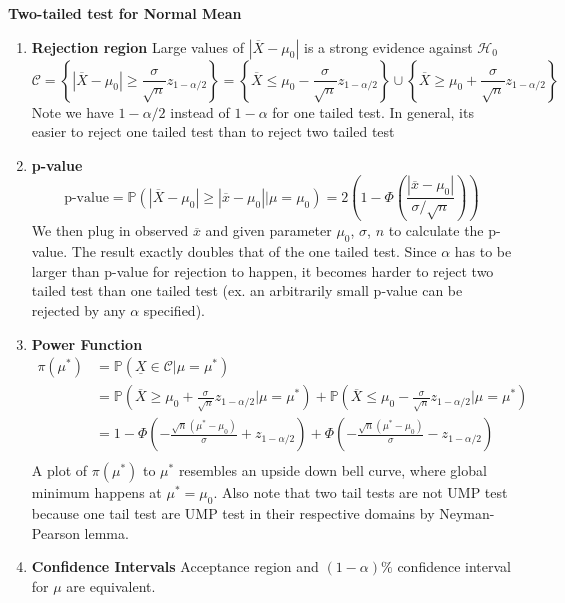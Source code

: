 \documentclass[11pt]{article}
\begin{document}
\begin{example}
  \textbf{Two-tailed test for Normal Mean}
  \begin{enumerate}
    \item \textbf{Rejection region} Large values of $|\overline{X} - \mu_0|$ is a strong evidence against $\mathcal{H}_0$
    \[
      \mathcal{C} = \left\{ | \overline{X} - \mu_0| \geq \frac{\sigma}{\sqrt{n}} z_{1 - \alpha / 2} \right\} =  \left\{ \overline{X} \leq \mu_0 - \frac{\sigma}{\sqrt{n}} z_{1 - \alpha / 2} \right\} \cup  \left\{ \overline{X} \geq \mu_0  + \frac{\sigma}{\sqrt{n}} z_{1 - \alpha / 2} \right\}
    \]
    Note we have $1 - \alpha / 2$ instead of $1 - \alpha$ for one tailed test. In general, its easier to reject one tailed test than to reject two tailed test
    \item \textbf{p-value}
    \[
      \text{p-value} = \mathbb{P}\left(|\overline{X} - \mu_0| \geq |\overline{x} - \mu_0| \biggr\rvert \mu = \mu_0\right) = 2(1 - \Phi(\frac{|\overline{x} - \mu_0|}{\sigma / \sqrt{n}}) )
    \]
    We then plug in observed $\overline{x}$ and given parameter $\mu_0$, $\sigma$, $n$ to calculate the p-value. The result exactly doubles that of the one tailed test. Since $\alpha$ has to be larger than p-value for rejection to happen, it becomes harder to reject two tailed test than one tailed test (ex. an arbitrarily small p-value can be rejected by any $\alpha$ specified).
    \item \textbf{Power Function}
    \begin{align*}
      \pi(\mu^*) &= \mathbb{P}(\underline{X}\in \mathcal{C} | \mu = \mu^*) \\
      &= \mathbb{P}(\overline{X} \geq \mu_0 + \frac{\sigma}{\sqrt{n}}z_{1 - \alpha / 2} | \mu = \mu^*) + \mathbb{P}(\overline{X} \leq \mu_0 - \frac{\sigma}{\sqrt{n}}z_{1 - \alpha / 2} | \mu = \mu^*)\\
      &= 1- \Phi(-\frac{\sqrt{n}(\mu^* - \mu_0)}{\sigma} + z_{1 - \alpha/2}) + \Phi(-\frac{\sqrt{n}(\mu^* - \mu_0)}{\sigma} - z_{1 - \alpha/2})\\
    \end{align*}
    A plot of $\pi(\mu^*)$ to $\mu^*$ resembles an upside down bell curve, where global minimum happens at $\mu^* = \mu_0$. Also note that two tail tests are not UMP test because one tail test are UMP test in their respective domains by Neyman-Pearson lemma.
    \item \textbf{Confidence Intervals} Acceptance region and $(1-\alpha)\%$ confidence interval for $\mu$ are equivalent.
    \begin{align*}

\end{align*}
\end{enumerate}
\end{example}
\end{document}
